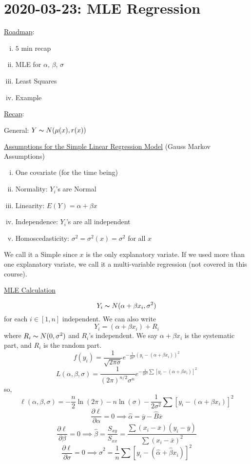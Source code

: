 \section{2020-03-23: MLE Regression}
\underline{Roadmap}:
\begin{enumerate}[(i)]
    \item $ 5 $ min recap
    \item MLE for $ \alpha,\,\beta,\,\sigma $
    \item Least Squares
    \item Example
\end{enumerate}

\underline{Recap}:

General: $ Y \thicksim N(\mu(x),r(x)) $

\underline{Assumptions for the Simple Linear Regression Model}
(Gauss Markov Assumptions)
\begin{enumerate}[(i)]
    \item One covariate (for the time being)
    \item Normality: $ Y_i $'s are Normal
    \item Linearity: $ E(Y)=\alpha+\beta x $
    \item Independence: $ Y_i $'s are all independent
    \item Homoscedasticity: $ \sigma^2=\sigma^2(x)=\sigma^2 $ for all $ x $
\end{enumerate}
We call it a Simple since $ x $ is the only
explanatory variate. If we used more than one explanatory variate,
we call it a multi-variable regression (not covered in this course).

\underline{MLE Calculation}

\[ Y_i \thicksim N(\alpha+\beta x_i, \sigma^2) \]
for each $ i\in[1,n] $
independent. We can also write
\[ Y_i=(\alpha+\beta x_i)+R_i \]
where $ R_i \thicksim N(0,\sigma^2) $ and $ R_i $'s independent.
We say $ \alpha+\beta x_i $ is the systematic part, and $ R_i $ is the random part.
\[ f(y_i)=\frac{1}{\sqrt{2 \pi \sigma}}e^{-\frac{1}{2\sigma^2}(y_i-(\alpha+\beta x_i))^2}  \]
\[
    L(\alpha, \beta, \sigma)=
    \frac{1}{(2 \pi)^{n / 2} \sigma^{n}}
    e^{-\frac{1}{2 \sigma^{2}}
            \sum\left[y_{i}-\left(\alpha+\beta x_i\right)\right]^{2}}
\]
so,
\[ \ell(\alpha,\beta,\sigma)=-\frac{n}{2} \ln(2\pi)-n\ln(\sigma)-
    \frac{1}{2\sigma^2}\sum\left[y_{i}-\left(\alpha+\beta x_i\right)\right]^{2}  \]
\[ \frac{\partial\ell}{\partial\alpha}=0\implies
    \hat{\alpha}=\overline{y}-\hat{B}\overline{x} \]
\[ \frac{\partial \ell}{\partial \beta}=0\implies
    \hat{\beta}=\frac{S_{xy}}{S_{xx}}=\frac{\sum(x_i-\overline{x})(y_i-\overline{y})}
    {\sum (x_i-\overline{x})^2}  \]
\[ \frac{\partial\ell}{\partial \sigma}=0\implies
    \hat{\sigma}^2=\frac{1}{n} \sum \left[ y_i-(\hat{\alpha}+\hat{\beta}x_i) \right]^2 \]


